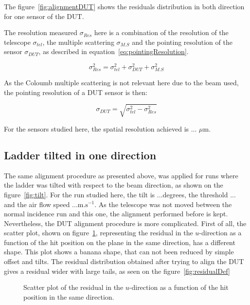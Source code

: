       The figure~\ref{fig:alignmentDUT} shows the residuals distribution in both direction for one sensor of the \gls{DUT}.

      The resolution measured $\sigma_{Res}$ here is a combination of the resolution of the telescope $\sigma_{tel}$, the multiple scattering $\sigma_{M.S}$ and the pointing resolution of the sensor $\sigma_{DUT}$, as described in equation~\ref{eq:pointingResolution}.
      
      \begin{equation}
        \sigma_{Res}^2 = \sigma_{tel}^2 + \sigma_{DUT}^2 + \sigma_{M.S}^2
        \label{eq:pointingResolution}
      \end{equation}

      As the Coloumb multiple scattering is not relevant here due to the beam used, the pointing resolution of a \gls{DUT} sensor is then:

      \begin{equation}
        \sigma_{DUT} = \sqrt{\sigma_{tel}^2 - \sigma_{Res}^2}
      \end{equation}

      For the sensors studied here, the spatial resolution achieved is ... $\mu\text{m}$.

    \subsection{Ladder tilted in one direction}
    \label{subsec:deformation}

      The same alignment procedure as presented above, was applied for runs where the ladder was tilted with respect to the beam direction, as shown on the figure~\ref{fig:tilt}.
      For the run studied here, the tilt is ...degrees, the threshold ... and the air flow speed ...$\text{m.s}^{-1}$.
      As the telescope was not moved between the normal incidence run and this one, the alignment performed before is kept.
      Nevertheless, the \gls{DUT} alignment procedure is more complicated. 
      First of all, the scatter plot, shown on figure~\ref{fig:scatterDUU}, representing the residual in the $u$-direction as a function of the hit position on the plane in the same direction, has a different shape.
      This plot shows a banana shape, that can not been reduced by simple offset and tilts.
      The residual distribution obtained after trying to align the \gls{DUT} gives a residual wider with large tails, as seen on the figure~\ref{fig:residualDef}

      \begin{figure}
        \caption{Scatter plot of the residual in the $u$-direction as a function of the hit position in the same direction.}
        \label{fig:scatterDUU}
      \end{figure}

